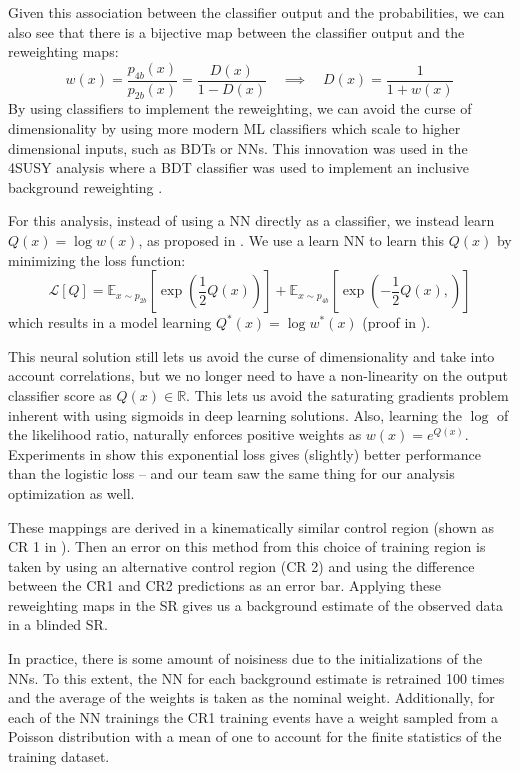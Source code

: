 Given this association between the classifier output and the probabilities, we can also see that there is a bijective map between the classifier output and the reweighting maps: 
\begin{equation*}
w(x) = \frac{p_{4b}(x)}{p_{2b}(x)} = \frac{D(x)}{1 - D(x)} \quad \implies \quad D(x) = \frac{1}{1+w(x)}
\end{equation*}
By using classifiers to implement the reweighting, we can avoid the curse of dimensionality by using more modern ML classifiers which scale to higher dimensional inputs, such as BDTs or NNs.
This innovation was used in the 4\Pqb SUSY analysis where a BDT classifier was used to implement an inclusive background reweighting \cite{SUSY-2017-02}.

For this analysis, instead of using a NN directly as a classifier, we instead learn $Q(x)= \log w(x)$, as proposed in \cite{1911.00405}.
We use a learn NN to learn this $Q(x)$ by minimizing the loss function: 
\begin{equation}
	\mathcal{L}[Q] = \mathbb{E}_{x\sim p_{2b}} \left[ \exp\left(  \frac{1}{2} Q(x) \right) \right] + \mathbb{E}_{x\sim p_{4b}} \left[ \exp\left(  - \frac{1}{2} Q(x) , \right) \right]
\end{equation}
\noindent
which results in a model learning $Q^*(x) = \log w^*(x)$ (proof in \App{\ref{rw-loss-fct}}).

This neural solution still lets us avoid the curse of dimensionality and take into account correlations, but we no longer need to have a non-linearity on the output classifier score as $Q(x) \in \mathbb{R}$.
This lets us avoid the saturating gradients problem inherent with using sigmoids in deep learning solutions.
Also, learning the $\log$ of the likelihood ratio, naturally enforces positive weights as $w(x) = e^{Q(x)}$.
Experiments in \cite{1911.00405} show this exponential loss gives (slightly) better performance than the logistic loss -- and our team saw the same thing for our analysis optimization as well. 

These mappings are derived in a kinematically similar control region (shown as CR 1 in \Fig{\ref{fig:ggF-massplanes-allYrs-dat-4b-preXwt}}). Then an error on this method from this choice of training region is taken by using an alternative control region (CR 2) and using the difference between the CR1 and CR2 predictions as an error bar.
Applying these reweighting maps in the SR gives us a background estimate of the observed data in a blinded SR.

In practice, there is some amount of noisiness due to the initializations of the NNs. To this extent, the NN for each background estimate is retrained 100 times and the average of the weights is taken as the nominal weight.
Additionally, for each of the NN trainings the CR1 training events have a weight sampled from a Poisson distribution with a mean of one to account for the finite statistics of the training dataset.

